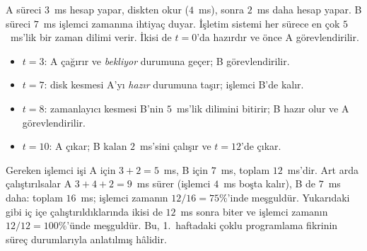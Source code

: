 \begin{example}
A süreci $3$~ms hesap yapar, diskten okur ($4$~ms), sonra $2$~ms daha hesap yapar. B süreci $7$~ms işlemci zamanına ihtiyaç duyar. İşletim sistemi her sürece en çok $5$~ms'lik bir zaman dilimi verir. İkisi de $t = 0$'da hazırdır ve önce A görevlendirilir.

\begin{center}
\end{center}

\begin{itemize}
  \item $t = 3$: A  çağırır ve \emph{bekliyor} durumuna geçer; B görevlendirilir.
  \item $t = 7$: disk kesmesi A'yı \emph{hazır} durumuna taşır; işlemci B'de kalır.
  \item $t = 8$: zamanlayıcı kesmesi B'nin $5$~ms'lik dilimini bitirir; B hazır olur ve A görevlendirilir.
  \item $t = 10$: A çıkar; B kalan $2$~ms'sini çalışır ve $t = 12$'de çıkar.
\end{itemize}
Gereken işlemci işi A için $3 + 2 = 5$~ms, B için $7$~ms, toplam $12$~ms'dir. Art arda çalıştırılsalar A $3 + 4 + 2 = 9$~ms sürer (işlemci $4$~ms boşta kalır), B de $7$~ms daha: toplam $16$~ms; işlemci zamanın $12/16 = 75\%$'inde meşguldür. Yukarıdaki gibi iç içe çalıştırıldıklarında ikisi de $12$~ms sonra biter ve işlemci zamanın $12/12 = 100\%$'ünde meşguldür. Bu, 1.~haftadaki çoklu programlama fikrinin süreç durumlarıyla anlatılmış hâlidir.
\end{example}

